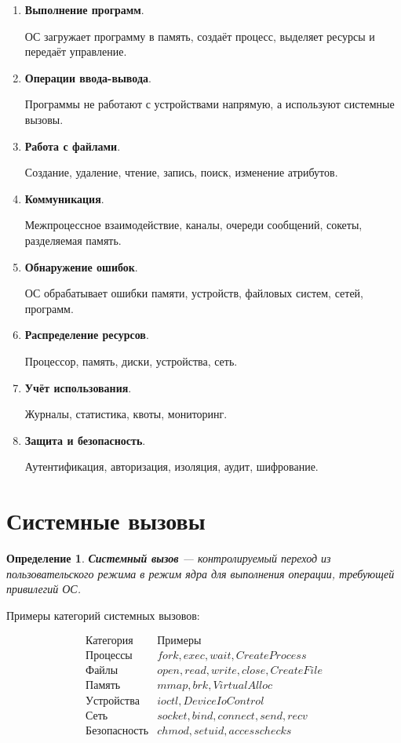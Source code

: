 \documentclass[12pt,a4paper]{article}
\newtheorem{definition}{Определение}
\begin{document}
\begin{enumerate}
    \item \textbf{Выполнение программ}.

    ОС загружает программу в память, создаёт процесс, выделяет ресурсы и передаёт управление.

    \item \textbf{Операции ввода-вывода}.

    Программы не работают с устройствами напрямую, а используют системные вызовы.

    \item \textbf{Работа с файлами}.

    Создание, удаление, чтение, запись, поиск, изменение атрибутов.

    \item \textbf{Коммуникация}.

    Межпроцессное взаимодействие, каналы, очереди сообщений, сокеты, разделяемая память.

    \item \textbf{Обнаружение ошибок}.

    ОС обрабатывает ошибки памяти, устройств, файловых систем, сетей, программ.

    \item \textbf{Распределение ресурсов}.

    Процессор, память, диски, устройства, сеть.

    \item \textbf{Учёт использования}.

    Журналы, статистика, квоты, мониторинг.

    \item \textbf{Защита и безопасность}.

    Аутентификация, авторизация, изоляция, аудит, шифрование.
\end{enumerate}

\section{Системные вызовы}

\begin{definition}
\textbf{Системный вызов} --- контролируемый переход из пользовательского режима в режим ядра для выполнения операции, требующей привилегий ОС.
\end{definition}

Примеры категорий системных вызовов:

\[
\begin{array}{c|l}
\text{Категория} & \text{Примеры} \\
\hline
Процессы & fork, exec, wait, CreateProcess \\
Файлы & open, read, write, close, CreateFile \\
Память & mmap, brk, VirtualAlloc \\
Устройства & ioctl, DeviceIoControl \\
Сеть & socket, bind, connect, send, recv \\
Безопасность & chmod, setuid, access checks
\end{array}
\]
\end{document}
